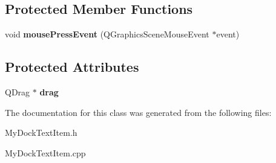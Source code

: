 \subsection*{Protected Member Functions}
\begin{DoxyCompactItemize}
\item 
\hypertarget{class_my_dock_text_item_a2948d3050a83589e02305a85022ef3e7}{}void {\bfseries mouse\+Press\+Event} (Q\+Graphics\+Scene\+Mouse\+Event $\ast$event)\label{class_my_dock_text_item_a2948d3050a83589e02305a85022ef3e7}

\end{DoxyCompactItemize}
\subsection*{Protected Attributes}
\begin{DoxyCompactItemize}
\item 
\hypertarget{class_my_dock_text_item_a8cb7660e2e72b8318a9365dbfbc8998e}{}Q\+Drag $\ast$ {\bfseries drag}\label{class_my_dock_text_item_a8cb7660e2e72b8318a9365dbfbc8998e}

\end{DoxyCompactItemize}


The documentation for this class was generated from the following files\+:\begin{DoxyCompactItemize}
\item 
My\+Dock\+Text\+Item.\+h\item 
My\+Dock\+Text\+Item.\+cpp\end{DoxyCompactItemize}
